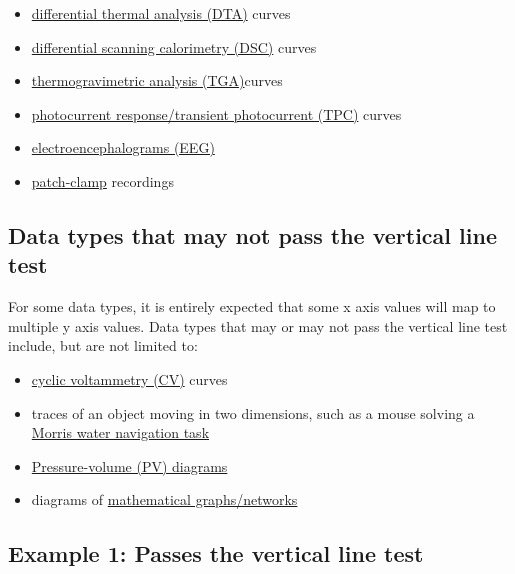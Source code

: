 \documentclass[letterpaper, 12pt]{article}
\begin{document}
\begin{itemize}
    \item \href{https://en.wikipedia.org/wiki/Differential_thermal_analysis}{differential thermal analysis (DTA)} curves
    \item \href{https://en.wikipedia.org/wiki/Differential_scanning_calorimetry}{differential scanning calorimetry (DSC)} curves
    \item \href{https://en.wikipedia.org/wiki/Thermogravimetric_analysis}{thermogravimetric analysis (TGA)}curves
    \item \href{https://en.wikipedia.org/wiki/Transient_photocurrent}{photocurrent response/transient photocurrent (TPC)} curves
    \item \href{https://en.wikipedia.org/wiki/Electroencephalography}{electroencephalograms (EEG)}
    \item \href{https://en.wikipedia.org/wiki/Patch_clamp}{patch-clamp} recordings
\end{itemize}

\subsection*{Data types that may not pass the vertical line test}

For some data types, it is entirely expected that some x axis values will map to multiple y axis values. Data types that may or may not pass the vertical line test include, but are not limited to:

\begin{itemize}
    \setlength\itemsep{-0.5em}
    \item \href{https://en.wikipedia.org/wiki/Cyclic_voltammetry}{cyclic voltammetry (CV)} curves
    \item traces of an object moving in two dimensions, such as a mouse solving a \href{https://en.wikipedia.org/wiki/Morris_water_navigation_task}{Morris water navigation task}
    \item \href{https://en.wikipedia.org/wiki/Pressure%E2%80%93volume_diagram}{Pressure-volume (PV) diagrams}
    \item diagrams of \href{https://en.wikipedia.org/wiki/Graph_theory}{mathematical graphs/networks}
\end{itemize}

\pagebreak

\subsection*{Example 1: Passes the vertical line test}
\end{document}
